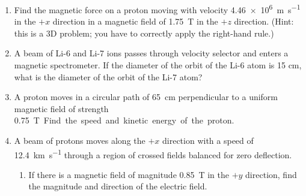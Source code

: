 \begin{enumerate}[itemsep=6pt]
%

\item Find the magnetic force on a proton moving with velocity
  \SI{4.46e6}{\metre\per\second} in the $+x$ direction in a magnetic field of
  \SI{1.75}{\tesla} in the $+z$ direction. (Hint: this is a 3D problem; you
  have to correctly apply the right-hand rule.)
  
\item A beam of Li-6 and Li-7 ions passes through velocity selector and
  enters a magnetic spectrometer. If the diameter of the orbit of the Li-6 atom
  is 15 cm, what is the diameter of the orbit of the Li-7 atom?

\item A proton moves in a circular path of \SI{65}{\centi\metre} perpendicular
  to a uniform magnetic field of strength \SI{.75}\tesla. Find the speed and
  kinetic energy of the proton.

\item A beam of protons moves along the $+x$ direction with a speed of
  \SI{12.4}{\kilo\metre\per\second} through a region of crossed fields balanced
  for zero deflection.
  \begin{enumerate}[itemsep=3pt]
    \item If there is a magnetic field of magnitude \SI{.85}{\tesla} in the
    $+y$ direction, find the magnitude and direction of the electric field.
    \vspace{\stretch1}
    

\end{enumerate}
\end{enumerate}

